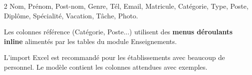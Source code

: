 \begin{multicols}{2}
{\tiny Nom, Pr\'enom, Post-nom, Genre, T\'el, Email, Matricule, Cat\'egorie, Type, Poste, Dipl\^ome, Sp\'ecialit\'e, Vacation, T\^ache, Photo.}

{\scriptsize Les colonnes r\'ef\'erence (Cat\'egorie, Poste...) utilisent des \textbf{menus d\'eroulants inline} aliment\'es par les tables du module Enseignements.}

\begin{tipbox}
\scriptsize L'import Excel est recommand\'e pour les \'etablissements avec beaucoup de personnel. Le mod\`ele contient les colonnes attendues avec exemples.
\end{tipbox}

\end{multicols}

\newpage

